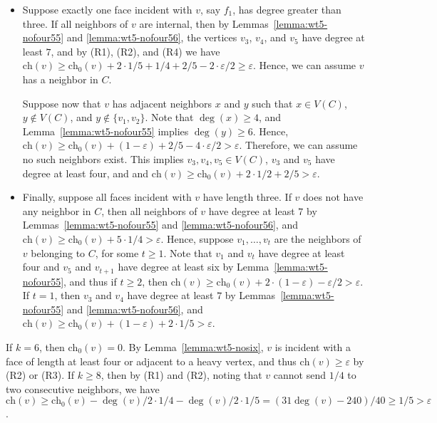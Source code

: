 \documentclass[12pt,twoside,openright,a4paper]{book}
\newcommand{\initch}{\text{ch}_0}
\newcommand{\finch}{\text{ch}}
\begin{document}
\begin{itemize}
\item Suppose exactly one face incident with $v$, say $f_1$, has degree greater than three.
If all neighbors of $v$ are internal, then by Lemmas~\ref{lemma:wt5-nofour55} and \ref{lemma:wt5-nofour56},
the vertices $v_3$, $v_4$, and $v_5$ have degree at least $7$, and by (R1), (R2), and (R4) we have
$\finch(v)\ge\initch(v)+2\cdot 1/5+1/4+2/5-2\cdot\varepsilon/2\ge \varepsilon$.  Hence, we can assume $v$ has a neighbor in $C$.

Suppose now that $v$ has adjacent neighbors $x$ and $y$ such that $x\in V(C)$, $y\not\in V(C)$, and $y\not\in \{v_1,v_2\}$.
Note that $\deg(x)\ge 4$, and Lemma~\ref{lemma:wt5-nofour55} implies $\deg(y)\ge 6$.  Hence,
$\finch(v)\ge\initch(v)+(1-\varepsilon)+2/5-4\cdot\varepsilon/2>\varepsilon$.  Therefore, we can assume no such neighbors exist.
This implies $v_3,v_4,v_5\in V(C)$, $v_3$ and $v_5$ have degree at least four, and
and $\finch(v)\ge \initch(v)+2\cdot 1/2+2/5>\varepsilon$.

\item Finally, suppose all faces incident with $v$ have length three.  If $v$ does not have any neighbor in $C$,
then all neighbors of $v$ have degree at least $7$ by Lemmas~\ref{lemma:wt5-nofour55} and \ref{lemma:wt5-nofour56},
and $\finch(v)\ge\initch(v)+5\cdot 1/4>\varepsilon$.  Hence, suppose $v_1, \ldots, v_t$ are the neighbors of $v$
belonging to $C$, for some $t\ge 1$.  Note that $v_1$ and $v_t$ have degree at least four and $v_5$ and $v_{t+1}$
have degree at least six by Lemma~\ref{lemma:wt5-nofour55}, and thus if $t\ge 2$, then
$\finch(v)\ge \initch(v)+2\cdot (1-\varepsilon)-\varepsilon/2>\varepsilon$.  If $t=1$, then $v_3$ and $v_4$
have degree at least $7$ by Lemmas~\ref{lemma:wt5-nofour55} and \ref{lemma:wt5-nofour56}, and
$\finch(v)\ge \initch(v)+(1-\varepsilon)+2\cdot 1/5>\varepsilon$.
\end{itemize}

If $k=6$, then $\initch(v)=0$.  By Lemma~\ref{lemma:wt5-nosix}, $v$ is incident with a face of length
at least four or adjacent to a heavy vertex, and thus $\finch(v)\ge \varepsilon$ by (R2) or (R3).
If $k\ge 8$, then by (R1) and (R2), noting that $v$ cannot send $1/4$ to two consecutive neighbors,
we have $\finch(v)\ge \initch(v)-\deg(v)/2\cdot 1/4-\deg(v)/2\cdot 1/5=(31\deg(v)-240)/40\ge 1/5>\varepsilon$.
\end{document}
